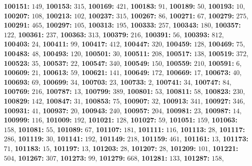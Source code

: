 \textsf{\bfseries 100151:} $149$, \textsf{\bfseries 100153:} $315$, \textsf{\bfseries 100169:} $421$, \textsf{\bfseries 100183:} $91$, \textsf{\bfseries 100189:} $50$, \textsf{\bfseries 100193:} $10$, \textsf{\bfseries 100207:} $108$, \textsf{\bfseries 100213:} $102$, \textsf{\bfseries 100237:} $315$, \textsf{\bfseries 100267:} $86$, \textsf{\bfseries 100271:} $67$, \textsf{\bfseries 100279:} $275$, \textsf{\bfseries 100291:} $465$, \textsf{\bfseries 100297:} $105$, \textsf{\bfseries 100313:} $195$, \textsf{\bfseries 100333:} $257$, \textsf{\bfseries 100343:} $180$, \textsf{\bfseries 100357:} $122$, \textsf{\bfseries 100361:} $237$, \textsf{\bfseries 100363:} $313$, \textsf{\bfseries 100379:} $216$, \textsf{\bfseries 100391:} $56$, \textsf{\bfseries 100393:} $812$, \textsf{\bfseries 100403:} $24$, \textsf{\bfseries 100411:} $99$, \textsf{\bfseries 100417:} $412$, \textsf{\bfseries 100447:} $320$, \textsf{\bfseries 100459:} $128$, \textsf{\bfseries 100469:} $75$, \textsf{\bfseries 100483:} $48$, \textsf{\bfseries 100493:} $120$, \textsf{\bfseries 100501:} $30$, \textsf{\bfseries 100511:} $208$, \textsf{\bfseries 100517:} $138$, \textsf{\bfseries 100519:} $372$, \textsf{\bfseries 100523:} $35$, \textsf{\bfseries 100537:} $22$, \textsf{\bfseries 100547:} $340$, \textsf{\bfseries 100549:} $150$, \textsf{\bfseries 100559:} $210$, \textsf{\bfseries 100591:} $6$, \textsf{\bfseries 100609:} $21$, \textsf{\bfseries 100613:} $59$, \textsf{\bfseries 100621:} $141$, \textsf{\bfseries 100649:} $172$, \textsf{\bfseries 100669:} $17$, \textsf{\bfseries 100673:} $40$, \textsf{\bfseries 100693:} $69$, \textsf{\bfseries 100699:} $34$, \textsf{\bfseries 100703:} $23$, \textsf{\bfseries 100733:} $2$, \textsf{\bfseries 100741:} $34$, \textsf{\bfseries 100747:} $84$, \textsf{\bfseries 100769:} $216$, \textsf{\bfseries 100787:} $13$, \textsf{\bfseries 100799:} $389$, \textsf{\bfseries 100801:} $53$, \textsf{\bfseries 100811:} $58$, \textsf{\bfseries 100823:} $230$, \textsf{\bfseries 100829:} $142$, \textsf{\bfseries 100847:} $31$, \textsf{\bfseries 100853:} $75$, \textsf{\bfseries 100907:} $32$, \textsf{\bfseries 100913:} $341$, \textsf{\bfseries 100927:} $346$, \textsf{\bfseries 100931:} $41$, \textsf{\bfseries 100937:} $20$, \textsf{\bfseries 100943:} $240$, \textsf{\bfseries 100957:} $204$, \textsf{\bfseries 100981:} $23$, \textsf{\bfseries 100987:} $14$, \textsf{\bfseries 100999:} $116$, \textsf{\bfseries 101009:} $192$, \textsf{\bfseries 101021:} $128$, \textsf{\bfseries 101027:} $59$, \textsf{\bfseries 101051:} $159$, \textsf{\bfseries 101063:} $158$, \textsf{\bfseries 101081:} $55$, \textsf{\bfseries 101089:} $67$, \textsf{\bfseries 101107:} $181$, \textsf{\bfseries 101111:} $116$, \textsf{\bfseries 101113:} $28$, \textsf{\bfseries 101117:} $286$, \textsf{\bfseries 101119:} $30$, \textsf{\bfseries 101141:} $192$, \textsf{\bfseries 101149:} $218$, \textsf{\bfseries 101159:} $461$, \textsf{\bfseries 101161:} $13$, \textsf{\bfseries 101173:} $71$, \textsf{\bfseries 101183:} $15$, \textsf{\bfseries 101197:} $13$, \textsf{\bfseries 101203:} $28$, \textsf{\bfseries 101207:} $28$, \textsf{\bfseries 101209:} $101$, \textsf{\bfseries 101221:} $504$, \textsf{\bfseries 101267:} $307$, \textsf{\bfseries 101273:} $99$, \textsf{\bfseries 101279:} $668$, \textsf{\bfseries 101281:} $133$, \textsf{\bfseries 101287:} $158$, 
